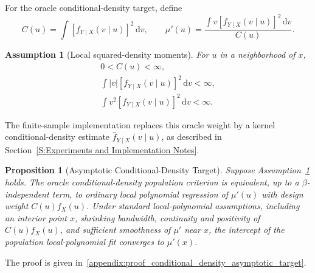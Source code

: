 \documentclass[preprint,1p,times,authoryear]{elsarticle}
\newtheorem{proposition}{Proposition}
\newtheorem{assumption}{Assumption}
\begin{document}
For the oracle conditional-density target, define
\[
C(u)=\int [f_{Y\mid X}(v\mid u)]^2\,\mathrm d v,
\qquad
\mu'(u)=
\frac{\int v[f_{Y\mid X}(v\mid u)]^2\,\mathrm d v}{C(u)}.
\]

\begin{assumption}[Local squared-density moments]
\label{ass:local_squared_density_moments}
For \(u\) in a neighborhood of \(x\),
\[
\begin{gathered}
0<C(u)<\infty,\\
\int |v|[f_{Y\mid X}(v\mid u)]^2\,\mathrm d v<\infty,\\
\int v^2[f_{Y\mid X}(v\mid u)]^2\,\mathrm d v<\infty.
\end{gathered}
\]
\end{assumption}

The finite-sample implementation replaces this oracle weight by a kernel conditional-density estimate \(\hat f_{Y\mid X}(v\mid u)\), as described in Section~\ref{S:Experiments and Implementation Notes}.

\begin{proposition}[Asymptotic Conditional-Density Target]
\label{prop:conditional_density_asymptotic_target}
Suppose Assumption~\ref{ass:local_squared_density_moments} holds. The oracle conditional-density population criterion is equivalent, up to a \(\beta\)-independent term, to ordinary local polynomial regression of \(\mu'(u)\) with design weight \(C(u)f_X(u)\). Under standard local-polynomial assumptions, including an interior point \(x\), shrinking bandwidth, continuity and positivity of \(C(u)f_X(u)\), and sufficient smoothness of \(\mu'\) near \(x\), the intercept of the population local-polynomial fit converges to \(\mu'(x)\).
\end{proposition}
The proof is given in~\ref{appendix:proof_conditional_density_asymptotic_target}.
\end{document}
